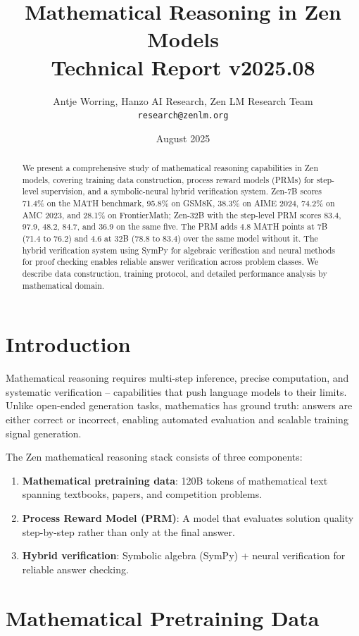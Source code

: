 \documentclass[11pt,a4paper]{article}
\title{\textbf{Mathematical Reasoning in Zen Models}\\
\large Technical Report v2025.08}
\author{Antje Worring, Hanzo AI Research, Zen LM Research Team\\
\texttt{research@zenlm.org}}
\date{August 2025}
\begin{document}
\maketitle

\begin{abstract}
We present a comprehensive study of mathematical reasoning capabilities in Zen models,
covering training data construction, process reward models (PRMs) for step-level
supervision, and a symbolic-neural hybrid verification system. Zen-7B scores 71.4\%
on the MATH benchmark, 95.8\% on GSM8K, 38.3\% on AIME 2024, 74.2\% on AMC 2023,
and 28.1\% on FrontierMath; Zen-32B with the step-level PRM scores 83.4, 97.9, 48.2,
84.7, and 36.9 on the same five. The PRM adds 4.8 MATH points at 7B (71.4 to 76.2)
and 4.6 at 32B (78.8 to 83.4) over the same model without it. The hybrid
verification system using SymPy for
algebraic verification and neural methods for proof checking enables reliable
answer verification across problem classes. We describe data construction, training
protocol, and detailed performance analysis by mathematical domain.
\end{abstract}

\section{Introduction}

Mathematical reasoning requires multi-step inference, precise computation, and
systematic verification -- capabilities that push language models to their limits.
Unlike open-ended generation tasks, mathematics has ground truth: answers are
either correct or incorrect, enabling automated evaluation and scalable training
signal generation.

The Zen mathematical reasoning stack consists of three components:
\begin{enumerate}
  \item \textbf{Mathematical pretraining data}: 120B tokens of mathematical text
    spanning textbooks, papers, and competition problems.
  \item \textbf{Process Reward Model (PRM)}: A model that evaluates solution quality
    step-by-step rather than only at the final answer.
  \item \textbf{Hybrid verification}: Symbolic algebra (SymPy) + neural verification
    for reliable answer checking.
\end{enumerate}

\section{Mathematical Pretraining Data}
\end{document}
